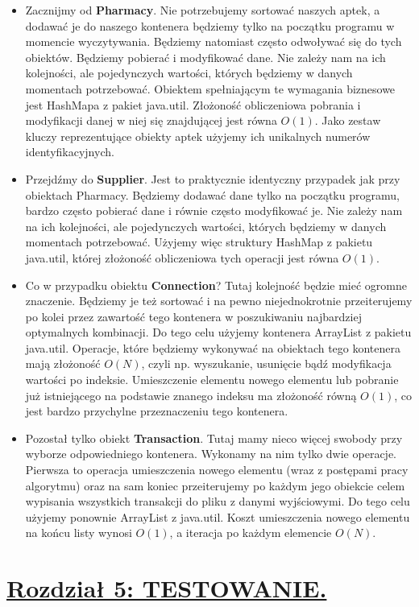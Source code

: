 \documentclass[a4paper]{article}
\begin{document}
\begin{itemize}
\item Zacznijmy od \textbf{Pharmacy}. Nie potrzebujemy sortować naszych aptek, a dodawać je do naszego kontenera będziemy tylko na początku programu w momencie wyczytywania. Będziemy natomiast często odwoływać się do tych obiektów. Będziemy pobierać i modyfikować dane. Nie zależy nam na ich kolejności, ale pojedynczych wartości, których będziemy w danych momentach potrzebować. Obiektem spełniającym te wymagania biznesowe jest HashMapa z pakiet java.util. Złożoność obliczeniowa pobrania i modyfikacji danej w niej się znajdującej jest równa $O(1)$. Jako zestaw kluczy reprezentujące obiekty aptek użyjemy ich unikalnych numerów identyfikacyjnych.
\item Przejdźmy do \textbf{Supplier}. Jest to praktycznie identyczny przypadek jak przy obiektach Pharmacy. Będziemy dodawać dane tylko na początku programu, bardzo często pobierać dane i równie często modyfikować je. Nie zależy nam na ich kolejności, ale pojedynczych wartości, których będziemy w danych momentach potrzebować. Użyjemy więc struktury HashMap z pakietu java.util, której złożoność obliczeniowa tych operacji jest równa $O(1)$. 
\item Co w przypadku obiektu \textbf{Connection}? Tutaj kolejność będzie mieć ogromne znaczenie. Będziemy je też sortować i na pewno niejednokrotnie przeiterujemy po kolei przez zawartość tego kontenera w poszukiwaniu najbardziej optymalnych kombinacji. Do tego celu użyjemy kontenera ArrayList z pakietu java.util. Operacje, które będziemy wykonywać na obiektach tego kontenera mają złożoność $O(N)$, czyli np. wyszukanie, usunięcie bądź modyfikacja wartości po indeksie. Umieszczenie elementu nowego elementu lub pobranie już istniejącego na podstawie znanego indeksu ma złożoność równą $O(1)$, co jest bardzo przychylne przeznaczeniu tego kontenera.
\item Pozostał tylko obiekt \textbf{Transaction}. Tutaj mamy nieco więcej swobody przy wyborze odpowiedniego kontenera. Wykonamy na nim tylko dwie operacje. Pierwsza to operacja umieszczenia nowego elementu (wraz z postępami pracy algorytmu) oraz na sam koniec przeiterujemy po każdym jego obiekcie celem wypisania wszystkich transakcji do pliku z danymi wyjściowymi. Do tego celu użyjemy ponownie ArrayList z java.util. Koszt umieszczenia nowego elementu na końcu listy wynosi $O(1)$, a iteracja po każdym elemencie $O(N)$.
\end{itemize}
\newpage

\section*{\underline{Rozdział 5: TESTOWANIE.}}
\end{document}
